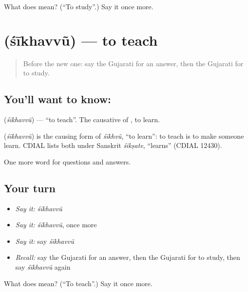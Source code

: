 \begin{tcolorbox}[breakable,colback=teal!4,colframe=teal!35!black,title={Before you move on}]
What does  mean? (\textquotedblleft{}To study\textquotedblright{}.) Say it once more.
\end{tcolorbox}
\section[\texorpdfstring{\gu{શીખવવું} (śīkhavvũ)}{શીખવવું (śīkhavvũ)}]{ (śīkhavvũ) — to teach}

\label{lesson:GU-C89-shikhavvu}



\begin{quote}
Before the new one: say the Gujarati for an answer, then the Gujarati for to study.
\end{quote}

\subsection*{You'll want to know: }
\textbf{} (\emph{śīkhavvũ}) — \textquotedblleft{}to teach\textquotedblright{}. The causative of \textbf{}, to learn.

\begin{cousinweb}
\textbf{} (\emph{śīkhavvũ}) is the causing form of \emph{śīkhvũ}, \textquotedblleft{}to learn\textquotedblright{}: to teach is to make someone learn. CDIAL lists both under Sanskrit \emph{śikṣate}, \textquotedblleft{}learns\textquotedblright{} (CDIAL 12430).
\end{cousinweb}

\begin{grammarlens}[title={What you've built}]
One more word for questions and answers.
\end{grammarlens}

\subsection*{Your turn}
\begin{itemize}
\raggedright
  \item \emph{Say it:} \emph{śīkhavvũ}
  \item \emph{Say it:} \emph{śīkhavvũ}, once more
  \item \emph{Say it:} say \emph{śīkhavvũ}
  \item \emph{Recall:} say the Gujarati for an answer, then the Gujarati for to study, then say \emph{śīkhavvũ} again
\end{itemize}

\begin{tcolorbox}[breakable,colback=teal!4,colframe=teal!35!black,title={Before you move on}]
What does  mean? (\textquotedblleft{}To teach\textquotedblright{}.) Say it once more.
\end{tcolorbox}
